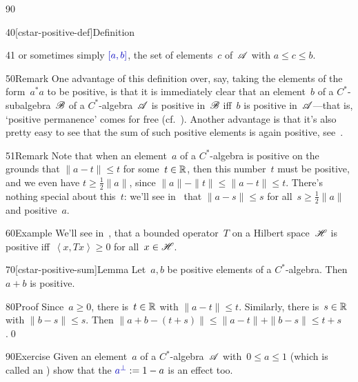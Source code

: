 \begin{parsec}{90}
\begin{point}{40}[cstar-positive-def]{Definition}
\begin{point}{41}
or sometimes simply $\Define{[a,b]}$,%
the set of elements~$c$ of~$\mathscr{A}$
with $a\leq c\leq b$.
\end{point}
\begin{point}{50}{Remark}%
One advantage of this
definition
over, say, taking the elements of the form~$a^*a$
to be positive,
is that it is immediately clear
that an element~$b$ of a $C^*$-subalgebra~$\mathscr{B}$
of a $C^*$-algebra~$\mathscr{A}$ is positive in~$\mathscr{B}$
iff~$b$ is positive in~$\mathscr{A}$---that is,
`positive permanence' comes for free (cf.~).
Another advantage is
that it's also pretty easy to see 
that the sum of such positive elements
is again positive, see~.
\end{point}
\begin{point}{51}{Remark}%
Note that when an element~$a$
of a $C^*$-algebra
is positive on the grounds that $\|a-t\|\leq t$
for some~$t\in \mathbb{R}$,
then this number~$t$ must be positive,
and we even have $t\geq \frac{1}{2}\|a\|$,
since $\|a\|-\|t\|\leq \|a-t\|\leq t$.
There's nothing special about this~$t$:
we'll see in~
that $\|a-s\|\leq s$
    for all~$s\geq \frac{1}{2} \|a\|$ and positive~$a$.
\end{point}
\end{point}
\begin{point}{60}{Example}%
We'll see in~,
that a bounded operator~$T$ on a Hilbert space~$\mathscr{H}$
is positive iff~$\left<x,Tx\right>\geq 0$ for all~$x\in\mathscr{H}$.
\end{point}
\begin{point}{70}[cstar-positive-sum]{Lemma}%
Let~$a,b$ be positive elements of a $C^*$-algebra.
Then $a+b$ is positive.
\begin{point}{80}{Proof}
Since~$a\geq 0$,
there is~$t\in \mathbb{R}$
    with $\|a-t\|\leq t$.
Similarly, there is~$s\in \mathbb{R}$
with $\|b-s\|\leq s$.
Then $\|a+b-(t+s)\|\leq \|a-t\|+\|b-s\|\leq t+s$.\qed
\end{point}
\end{point}
\begin{point}{90}{Exercise}%
Given an element~$a$
of a $C^*$-algebra~$\mathscr{A}$
with~$0\leq a\leq 1$
(which is called an )%
show that 
the  $\Define{a^\perp} :=1-a$%
%
is an effect too.
\end{point}

\end{parsec}

